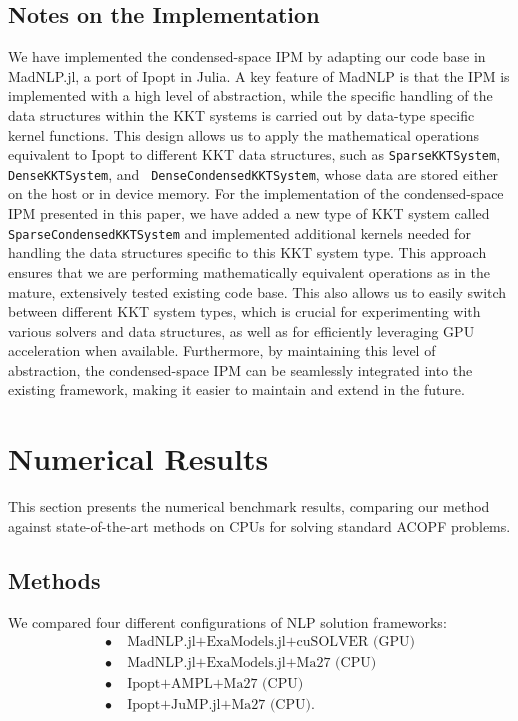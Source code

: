 \documentclass{IEEEtran4PSCC} %
\begin{document}
\subsection{Notes on the Implementation}
We have implemented the condensed-space IPM by adapting our code base
in MadNLP.jl, a port of Ipopt in Julia.
A key feature of MadNLP is that the IPM is implemented with a
high level of abstraction, while the specific handling of the data
structures within the KKT systems is carried out by data-type specific
kernel functions. This design allows us to apply the mathematical
operations equivalent to Ipopt to different KKT data structures, such as
{\tt SparseKKTSystem}, {\tt DenseKKTSystem}, and {\tt
DenseCondensedKKTSystem},  whose data are stored either on the host or in device memory. For the implementation of the condensed-space IPM
presented in this paper, we have added a new type of KKT system called
{\tt SparseCondensedKKTSystem} and implemented additional kernels
needed for handling the data structures specific to this KKT system
type. This approach ensures that we are performing mathematically
equivalent operations as in the mature, extensively tested existing
code base. This also allows us to easily switch between different KKT
system types, which is crucial for experimenting with various solvers
and data structures, as well as for efficiently leveraging GPU
acceleration when available. Furthermore, by maintaining this level of
abstraction, the condensed-space IPM can be seamlessly integrated into
the existing framework, making it easier to maintain and extend in the
future.

\section{Numerical Results}\label{sec:num}

This section presents the numerical benchmark results, comparing our
method against state-of-the-art methods on CPUs for solving standard
ACOPF problems.

\subsection{Methods}

We compared four different configurations of NLP solution frameworks:
\begin{align}
  \label{config-1}\tag{Config 1} \bullet\;&\text{MadNLP.jl+ExaModels.jl+cuSOLVER (GPU)}\\
  \label{config-2}\tag{Config 2} \bullet\;&\text{MadNLP.jl+ExaModels.jl+Ma27 (CPU)}\\
  \label{config-3}\tag{Config 3} \bullet\;&\text{Ipopt+AMPL+Ma27 (CPU)}\\
  \label{config-4}\tag{Config 4} \bullet\;&\text{Ipopt+JuMP.jl+Ma27 (CPU)}.
\end{align}
\end{document}
